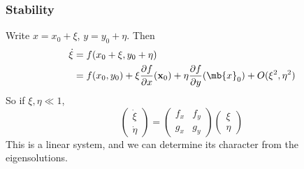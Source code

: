 \documentclass[a4paper]{article}
\begin{document}
    \subsubsection{Stability}
    Write $x = x_0 + \xi$, $y = y_0 + \eta$. Then
    \begin{align*}
      \dot \xi &= f(x_0 + \xi, y_0 + \eta)\\
      &= f(x_0, y_0)+ \xi \frac{\partial f}{\partial x}(\mathbf{x}_0) + \eta \frac{\partial f}{\partial y}(\mb{x}_0) + O(\xi^2, \eta^2)
    \end{align*}
    So if $\xi, \eta \ll 1$, 
    \[
      \begin{pmatrix}
        \dot \xi\\\dot \eta
      \end{pmatrix} = 
      \begin{pmatrix}
        f_x & f_y\\
        g_x & g_y
      \end{pmatrix}
      \begin{pmatrix}
        \xi\\\eta
      \end{pmatrix}
    \]
    This is a linear system, and we can determine its character from the eigensolutions. 
\end{document}
